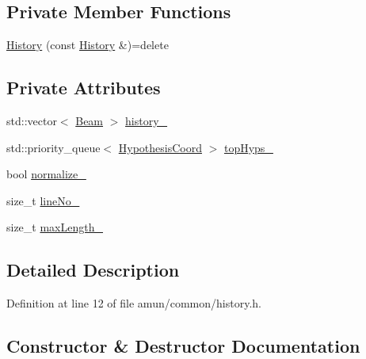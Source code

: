 \subsection*{Private Member Functions}
\begin{DoxyCompactItemize}
\item 
\hyperlink{classamunmt_1_1History_ac5f3e4be93bcf4709ec53313868af48d}{History} (const \hyperlink{classamunmt_1_1History}{History} \&)=delete
\end{DoxyCompactItemize}
\subsection*{Private Attributes}
\begin{DoxyCompactItemize}
\item 
std\+::vector$<$ \hyperlink{namespaceamunmt_a534a3a9a1d99c01a5adf05e700a26012}{Beam} $>$ \hyperlink{classamunmt_1_1History_af461c82a737eb49ea7f0374082294875}{history\+\_\+}
\item 
std\+::priority\+\_\+queue$<$ \hyperlink{structamunmt_1_1History_1_1HypothesisCoord}{Hypothesis\+Coord} $>$ \hyperlink{classamunmt_1_1History_a592117925905726ff46d3bfa3a55a529}{top\+Hyps\+\_\+}
\item 
bool \hyperlink{classamunmt_1_1History_ad43884859a97646dc7f1c8abbf9b50c4}{normalize\+\_\+}
\item 
size\+\_\+t \hyperlink{classamunmt_1_1History_a11989109ba68d057cce9a61560f4ab2e}{line\+No\+\_\+}
\item 
size\+\_\+t \hyperlink{classamunmt_1_1History_af78aa04752c1920599f44628311c2eef}{max\+Length\+\_\+}
\end{DoxyCompactItemize}


\subsection{Detailed Description}


Definition at line 12 of file amun/common/history.\+h.



\subsection{Constructor \& Destructor Documentation}
